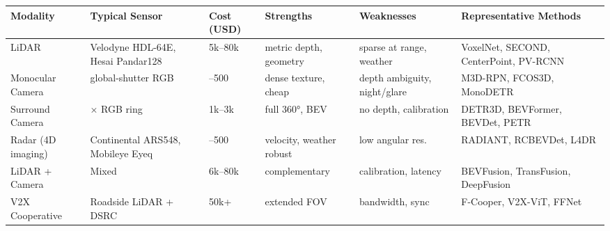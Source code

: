 {\def\LTcaptype{none} %
\begin{longtable}[]{@{}
  >{\raggedright\arraybackslash}p{}
  >{\raggedright\arraybackslash}p{}
  >{\raggedright\arraybackslash}p{}
  >{\raggedright\arraybackslash}p{}
  >{\raggedright\arraybackslash}p{}
  >{\raggedright\arraybackslash}p{}@{}}
\toprule\noalign{}
\begin{minipage}[b]{\linewidth}\raggedright
Modality
\end{minipage} & \begin{minipage}[b]{\linewidth}\raggedright
Typical Sensor
\end{minipage} & \begin{minipage}[b]{\linewidth}\raggedright
Cost (USD)
\end{minipage} & \begin{minipage}[b]{\linewidth}\raggedright
Strengths
\end{minipage} & \begin{minipage}[b]{\linewidth}\raggedright
Weaknesses
\end{minipage} & \begin{minipage}[b]{\linewidth}\raggedright
Representative Methods
\end{minipage} \\
\midrule\noalign{}
\endhead
\bottomrule\noalign{}
\endlastfoot
LiDAR & Velodyne HDL-64E, Hesai Pandar128 & 5k--80k & metric depth, geometry & sparse at range, weather & VoxelNet, SECOND, CenterPoint, PV-RCNN \\
Monocular Camera & global-shutter RGB & 100--500 & dense texture, cheap & depth ambiguity, night/glare & M3D-RPN, FCOS3D, MonoDETR \\
Surround Camera & 6× RGB ring & 1k--3k & full 360°, BEV & no depth, calibration & DETR3D, BEVFormer, BEVDet, PETR \\
Radar (4D imaging) & Continental ARS548, Mobileye Eyeq & 100--500 & velocity, weather robust & low angular res. & RADIANT, RCBEVDet, L4DR \\
LiDAR + Camera & Mixed & 6k--80k & complementary & calibration, latency & BEVFusion, TransFusion, DeepFusion \\
V2X Cooperative & Roadside LiDAR + DSRC & 50k+ & extended FOV & bandwidth, sync & F-Cooper, V2X-ViT, FFNet \\
\end{longtable}
}


